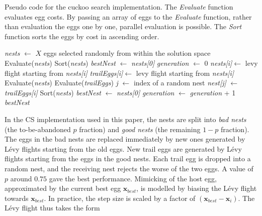\documentclass[a4paper, 5p, sort&compress]{elsarticle}%
\newcommand{\paren}[1]{\left(#1\right)}
\begin{document}
\begin{algorithm*}[t]
  \caption{Pseudo code for the cuckoo search implementation. The
    \textit{Evaluate} function evaluates egg costs. By passing an
    array of eggs to the \textit{Evaluate} function, rather than
    evaluation the eggs one by one, parallel evaluation is
    possible. The \textit{Sort} function sorts the eggs by cost in
    ascending order.}
  \label{csAlgo}
  \begin{algorithmic}
    \State \textit{nests} $\gets$ $X$ eggs selected randomly from within the
    solution space
    \State Evaluate(\textit{nests})
    \State Sort(\textit{nests})
    \State \textit{bestNest} $\gets$ \textit{nests[0]}
    \State \textit{generation} $\gets$ 0
    \State \textit{nests[i]}$\gets$ levy flight starting from \textit{nests[i]}
    \EndFor
    \State \textit{trailEggs[i]}$\gets$ levy flight starting from \textit{nests[i]}
    \EndFor
    \State Evaluate(\textit{nests})
    \State Evaluate(\textit{trailEggs})
    \State \textit{j} $\gets$ index of a random nest
    \State \textit{nest[j]} $\gets$ \textit{trailEggs[i]}
    \EndIf
    \EndFor
    \State Sort(\textit{nests})
    \State \textit{bestNest} $\gets$ \textit{nests[0]}
    \State \textit{generation} $\gets$ \textit{generation} + 1
    \EndWhile
    \State \Return \textit{bestNest}
    \EndFunction
  \end{algorithmic}
\end{algorithm*}


In the CS implementation used in this paper, the nests are split into
\textit{bad nests} (the to-be-abandoned $p$ fraction) and
\textit{good nests} (the remaining $1-p$ fraction). The eggs in the
bad nests are replaced immediately by new ones generated by Lévy
flights starting from the old eggs. New trail eggs are generated by
Lévy flights starting from the eggs in the good nests. Each trail egg
is dropped into a random nest, and the receiving nest rejects the
worse of the two eggs. A value of $p$ around $0.75$ gave the best
performance. Mimicking of the host egg, approximated by the current
best egg $\boldsymbol x_{best}$, is modelled by biasing the Lévy
flight towards $\boldsymbol x_{best}$. In practice, the step size is
scaled by a factor of
$\paren{\boldsymbol x_{best}- \boldsymbol x_{i}}$. The Lévy flight
thus takes the form
\end{document}
